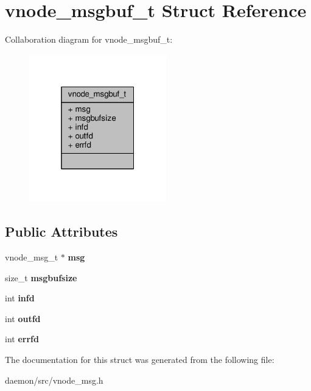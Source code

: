 \hypertarget{structvnode__msgbuf__t}{\section{vnode\+\_\+msgbuf\+\_\+t Struct Reference}
\label{structvnode__msgbuf__t}
}


Collaboration diagram for vnode\+\_\+msgbuf\+\_\+t\+:
\nopagebreak
\begin{figure}[H]
\begin{center}
\leavevmode
\includegraphics[width=169pt]{structvnode__msgbuf__t__coll__graph}
\end{center}
\end{figure}
\subsection*{Public Attributes}
\begin{DoxyCompactItemize}
\item 
\hypertarget{structvnode__msgbuf__t_a2377e486dff0cdd78af07e4eaf581351}{vnode\+\_\+msg\+\_\+t $\ast$ {\bfseries msg}}\label{structvnode__msgbuf__t_a2377e486dff0cdd78af07e4eaf581351}

\item 
\hypertarget{structvnode__msgbuf__t_afdf8d50cb93e2981a37875c86b7706ca}{size\+\_\+t {\bfseries msgbufsize}}\label{structvnode__msgbuf__t_afdf8d50cb93e2981a37875c86b7706ca}

\item 
\hypertarget{structvnode__msgbuf__t_a88da4a4e16dfe1e5389568448d115f7a}{int {\bfseries infd}}\label{structvnode__msgbuf__t_a88da4a4e16dfe1e5389568448d115f7a}

\item 
\hypertarget{structvnode__msgbuf__t_a055bcdd4255ff38f19ff4e67f985ad75}{int {\bfseries outfd}}\label{structvnode__msgbuf__t_a055bcdd4255ff38f19ff4e67f985ad75}

\item 
\hypertarget{structvnode__msgbuf__t_af3f51f1359f2d082f18af8384ece204d}{int {\bfseries errfd}}\label{structvnode__msgbuf__t_af3f51f1359f2d082f18af8384ece204d}

\end{DoxyCompactItemize}


The documentation for this struct was generated from the following file\+:\begin{DoxyCompactItemize}
\item 
daemon/src/vnode\+\_\+msg.\+h\end{DoxyCompactItemize}
